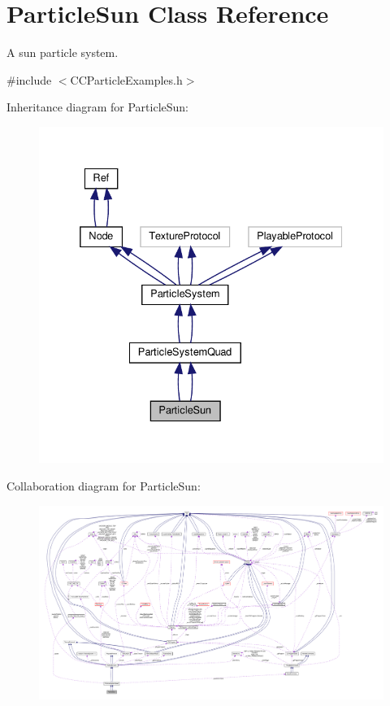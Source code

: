 \hypertarget{classParticleSun}{}\section{Particle\+Sun Class Reference}
\label{classParticleSun}


A sun particle system.  




{\ttfamily \#include $<$C\+C\+Particle\+Examples.\+h$>$}



Inheritance diagram for Particle\+Sun\+:
\nopagebreak
\begin{figure}[H]
\begin{center}
\leavevmode
\includegraphics[width=332pt]{classParticleSun__inherit__graph}
\end{center}
\end{figure}


Collaboration diagram for Particle\+Sun\+:
\nopagebreak
\begin{figure}[H]
\begin{center}
\leavevmode
\includegraphics[width=350pt]{classParticleSun__coll__graph}
\end{center}
\end{figure}
